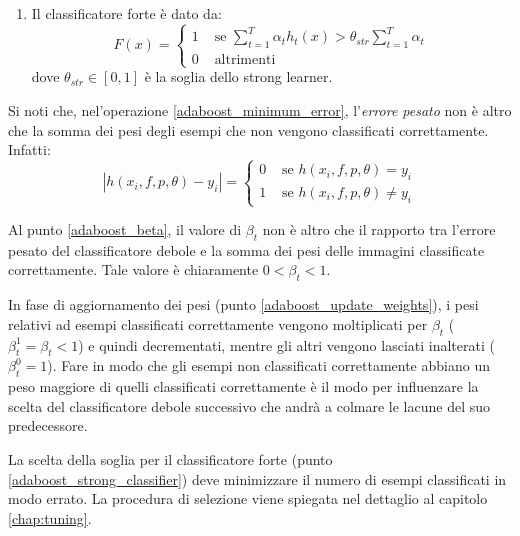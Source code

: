 \begin{enumerate}
                \item \label{adaboost_strong_classifier} Il classificatore forte è dato da:
                \begin{equation}\label{eq:strong_classifier}
                    F(x) = 
                    \begin{cases}
                        1 & \text{ se } \sum_{t = 1}^{T} \alpha_t h_t(x) > \theta_{str} \sum_{t = 1}^{T} \alpha_t \\
                        0 & \text{ altrimenti }
                    \end{cases}
                \end{equation}
                dove $\theta_{str} \in [0,1]$ è la soglia dello strong learner.
            \end{enumerate}
            
            Si noti che, nel'operazione \ref{adaboost_minimum_error}, l'\emph{errore pesato} non è altro che la somma dei pesi degli esempi che non vengono classificati correttamente. 
            Infatti:
            \begin{equation}
                \label{subeq:minimum_error_evaluation}
                |h(x_i, f, p, \theta) - y_i| = 
                \begin{cases}
                    0 & \text{ se } h(x_i, f, p, \theta) = y_i \\
                    1 & \text{ se } h(x_i, f, p, \theta) \neq y_i
                \end{cases}
            \end{equation}

            Al punto \ref{adaboost_beta}, il valore di $\beta_t$ non è altro che il rapporto tra l'errore pesato del classificatore debole e la somma dei pesi delle immagini classificate correttamente. Tale valore è chiaramente $0 < \beta_t < 1$.

            In fase di aggiornamento dei pesi (punto \ref{adaboost_update_weights}), i pesi relativi ad esempi classificati correttamente vengono moltiplicati per $\beta_t$ ($\beta_{t}^{1} = \beta_t < 1$) e quindi decrementati, mentre gli altri vengono lasciati inalterati ($\beta_{t}^{0} = 1$). 
            Fare in modo che gli esempi non classificati correttamente abbiano un peso maggiore di quelli classificati correttamente è il modo per influenzare la scelta del classificatore debole successivo che andrà a colmare le lacune del suo predecessore.

            La scelta della soglia per il classificatore forte (punto \ref{adaboost_strong_classifier}) deve minimizzare il numero di esempi classificati in modo errato.
            La procedura di selezione viene spiegata nel dettaglio al capitolo \ref{chap:tuning}.
    
